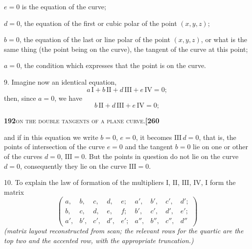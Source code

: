 \documentclass[11pt]{article}
\begin{document}
$e = 0$ is the equation of the curve;

$d = 0$, the equation of the first or cubic polar of the point $(x, y, z)$;

$b = 0$, the equation of the last or line polar of the point $(x, y, z)$, or what is the same thing (the point being on the curve), the tangent of the curve at this point;

$a = 0$, the condition which expresses that the point is on the curve.

\medskip

9. Imagine now an identical equation,
\[
a\,\mathrm{I} + b\,\mathrm{II} + d\,\mathrm{III} + e\,\mathrm{IV} = 0;
\]
then, since $a = 0$, we have
\[
b\,\mathrm{II} + d\,\mathrm{III} + e\,\mathrm{IV} = 0;
\]

\newpage

\noindent\textbf{192}\hfill\textsc{on the double tangents of a plane curve.}\hfill\textbf{[260}

\medskip

\noindent and if in this equation we write $b = 0$, $e = 0$, it becomes $\mathrm{III}\,d = 0$, that is, the points of intersection of the curve $e = 0$ and the tangent $b = 0$ lie on one or other of the curves $d = 0$, $\mathrm{III} = 0$. But the points in question do not lie on the curve $d = 0$, consequently they lie on the curve $\mathrm{III} = 0$.

\medskip

10. To explain the law of formation of the multipliers $\mathrm{I}$, $\mathrm{II}$, $\mathrm{III}$, $\mathrm{IV}$, I form the matrix
\[
\begin{pmatrix}
a, & b, & c, & d, & e; & a', & b', & c', & d';\\
b, & c, & d, & e, & f; & b', & c', & d', & e';\\
a', & b', & c', & d', & e'; & a'', & b'', & c'', & d''
\end{pmatrix}
\]
\textit{(matrix layout reconstructed from scan; the relevant rows for the quartic are the top two and the accented row, with the appropriate truncation.)}

\medskip
\end{document}
